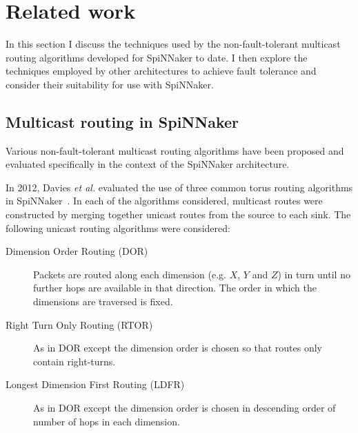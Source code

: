 	\section{Related work}
		
		In this section I discuss the techniques used by the non-fault-tolerant
		multicast routing algorithms developed for SpiNNaker to date. I then
		explore the techniques employed by other architectures to achieve fault
		tolerance and consider their suitability for use with SpiNNaker.
		
		\subsection{Multicast routing in SpiNNaker}
			
			Various non-fault-tolerant multicast routing algorithms have been
			proposed and evaluated specifically in the context of the SpiNNaker
			architecture.
			
			In 2012, Davies \emph{et al.} evaluated the use of three common torus
			routing algorithms in SpiNNaker~\cite{davies12}. In each of the
			algorithms considered, multicast routes were constructed by merging
			together unicast routes from the source to each sink. The following
			unicast routing algorithms were considered:
			
			\begin{description}
				
				\item[Dimension Order Routing (DOR)] Packets are routed along each
				dimension (e.g. $X$, $Y$ and $Z$) in turn until no further hops are
				available in that direction.  The order in which the dimensions are
				traversed is fixed.
				
				\item[Right Turn Only Routing (RTOR)] As in DOR except the dimension
				order is chosen so that routes only contain right-turns.
				
				\item[Longest Dimension First Routing (LDFR)] As in DOR except the
				dimension order is chosen in descending order of number of hops in each
				dimension.
				
			\end{description}
			
